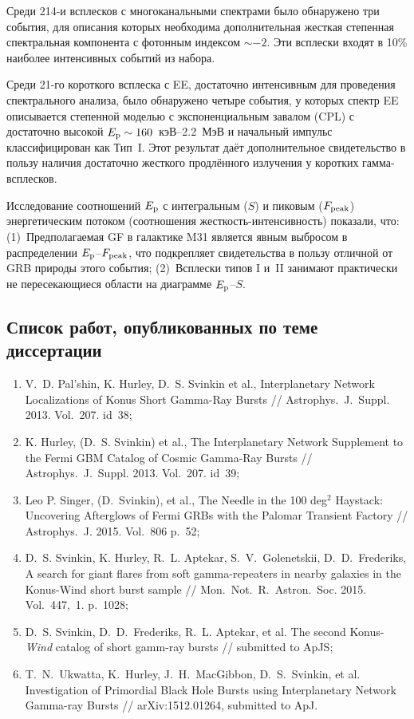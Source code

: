 \begin{enumerate}
    Среди 214-и всплесков с многоканальными спектрами было обнаружено три
    события, для описания которых необходима дополнительная жесткая степенная 
    спектральная компонента с фотонным индексом $\sim -2$. Эти всплески входят в 10\%
    наиболее интенсивных событий из набора. 
    
    Среди 21-го короткого всплеска с EE, достаточно интенсивным 
    для проведения спектрального анализа, было обнаружено четыре события, у которых 
    спектр EE описывается степенной моделью с экспоненциальным завалом (CPL) 
    с достаточно высокой $E_{\mathrm{p}} \sim 160$~кэВ--2.2~МэВ и начальный импульс 
    классифицирован как Тип~I. Этот результат даёт дополнительное свидетельство 
    в пользу наличия достаточно жесткого продлённого излучения у коротких гамма-всплесков. 
    
    Исследование соотношений $E_{\mathrm{p}}$ с интегральным ($S$) и пиковым ($F_{\mathrm{peak}}$) 
    энергетическим потоком (соотношения жесткость-интенсивность) показали, что:
    (1)~Предполагаемая GF в галактике M31 является явным выбросом в распределении 
    $E_{\mathrm{p}}$--$F_{\mathrm{peak}}$,  что подкрепляет свидетельства в пользу отличной 
    от GRB природы этого события;
    (2)~Всплески типов I и~II занимают практически не пересекающиеся области 
    на диаграмме $E_{\mathrm{p}}$--$S$.
  
\end{enumerate}


\subsection*{\Large Список работ, опубликованных по теме диссертации}
\begin{enumerate}
\item V.~D. Pal'shin, K. Hurley, D.~S. Svinkin et al., Interplanetary Network Localizations of
Konus Short Gamma-Ray Bursts // Astrophys.~J.~Suppl. 2013. Vol.~207. id~38;
\item K. Hurley, (D.~S. Svinkin) et al., The Interplanetary Network Supplement to 
the Fermi GBM Catalog of Cosmic Gamma-Ray Bursts // Astrophys.~J.~Suppl. 2013. Vol.~207. id~39;
\item Leo P. Singer, (D.~Svinkin), et al., The Needle in the 100 deg$^2$ Haystack: 
Uncovering Afterglows of Fermi GRBs with the Palomar Transient Factory // 
Astrophys.~J. 2015. Vol.~806 p.~52;
\item D.~S. Svinkin, K. Hurley, R.~L. Aptekar, S.~V.~Golenetskii, D.~D.~Frederiks, 
A search for giant flares from soft gamma-repeaters in nearby galaxies in the 
Konus-Wind short burst sample // Mon.~Not.~R.~Astron.~Soc. 2015. Vol.~447,~1. p.~1028;
\item D.~S. Svinkin, D.~D.~Frederiks, R.~L. Aptekar, et al.
The second Konus-\textit{Wind} catalog of short gamm-ray bursts // submitted to ApJS;
\item T.~N.~Ukwatta, K.~Hurley, J.~H.~MacGibbon, D.~S.~Svinkin, et al.
Investigation of Primordial Black Hole Bursts using Interplanetary Network Gamma-ray Bursts // 
arXiv:1512.01264, submitted to ApJ.

\end{enumerate}

\renewcommand{\refname}{Литература, цитируемая в автореферате}


